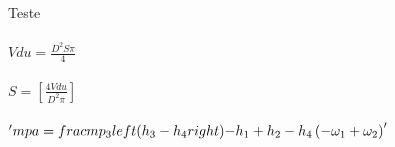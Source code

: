 \documentclass[48pt]{article}
\begin{document}
Teste\\\\
$ Vdu = \frac{D^{2} S \pi}{4} $ \\\\
$ S = \left[ \frac{4 Vdu}{D^{2} \pi}\right] $ \\\\
$ 'mpa = \\frac{mp_{3} \\left(h_{3} - h_{4}\\right)}{- h_{1} + h_{2} - h_{4} \left(- \omega_{1} + \omega_{2}\right)}' $
\end{document}
